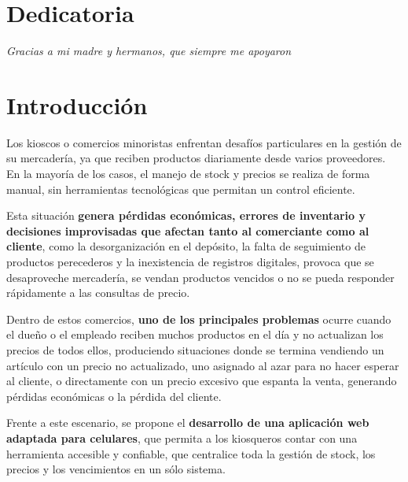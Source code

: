 \documentclass[twoside]{article}
\begin{document}
\newpage
\section*{Dedicatoria}
\textit{Gracias a mi madre y hermanos, que siempre me apoyaron}
\newpage
\tableofcontents
\newpage

\section{Introducción}
Los kioscos o comercios minoristas enfrentan desafíos particulares en la gestión de su mercadería, ya que reciben productos diariamente desde varios proveedores. En la mayoría de los casos, el manejo de stock y precios se realiza de forma manual, sin herramientas tecnológicas que permitan un control eficiente.\par
Esta situación \textbf{genera pérdidas económicas, errores de inventario y decisiones improvisadas que afectan tanto al comerciante como al cliente}, como la desorganización en el depósito, la falta de seguimiento de productos perecederos y la inexistencia de registros digitales, provoca que se desaproveche mercadería, se vendan productos vencidos o no se pueda responder rápidamente a las consultas de precio.\par
Dentro de estos comercios, \textbf{uno de los principales problemas} ocurre cuando el dueño o el empleado reciben muchos productos en el día y no actualizan los precios de todos ellos, produciendo situaciones donde se termina vendiendo un artículo con un precio no actualizado, uno asignado al azar para no hacer esperar al cliente, o directamente con un precio excesivo que espanta la venta, generando pérdidas económicas o la pérdida del cliente.\par
Frente a este escenario, se propone el \textbf{desarrollo de una aplicación web adaptada para celulares}, que permita a los kiosqueros contar con una herramienta accesible y confiable, que centralice toda la gestión de stock, los precios y los vencimientos en un sólo sistema.
\end{document}
